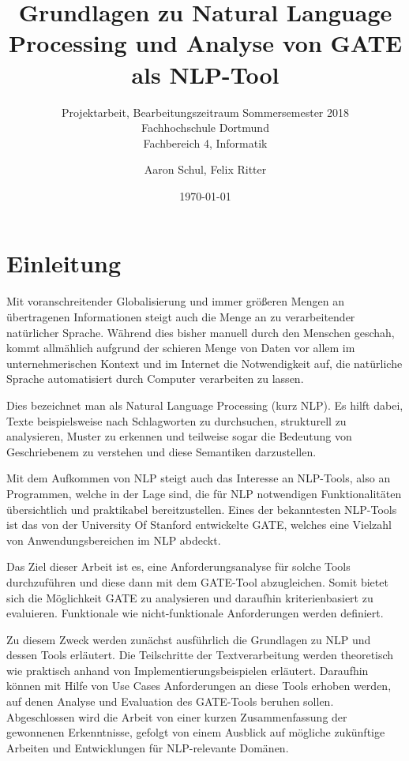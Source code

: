 \documentclass[12pt]{paper}
\begin{document}
\title{Grundlagen zu Natural Language Processing und Analyse von GATE als NLP-Tool}
\author{Aaron Schul, Felix Ritter}
\subtitle{Projektarbeit, Bearbeitungszeitraum Sommersemester 2018\\
Fachhochschule Dortmund \\
Fachbereich 4, Informatik}
\date{\today}
\maketitle

\newpage
\tableofcontents
\newpage
\listoftables

\newpage
\section{Einleitung}
Mit voranschreitender Globalisierung und immer größeren Mengen an übertragenen Informationen steigt auch die Menge an zu verarbeitender natürlicher Sprache. Während dies bisher manuell durch den Menschen geschah, kommt allmählich aufgrund der schieren Menge von Daten vor allem im unternehmerischen Kontext und im Internet die Notwendigkeit auf, die natürliche Sprache automatisiert durch Computer verarbeiten zu lassen.

Dies bezeichnet man als Natural Language Processing (kurz NLP). Es hilft dabei, Texte beispielsweise nach Schlagworten zu durchsuchen, strukturell zu analysieren, Muster zu erkennen und teilweise sogar die Bedeutung von Geschriebenem zu verstehen und diese Semantiken darzustellen.

Mit dem Aufkommen von NLP steigt auch das Interesse an NLP-Tools, also an Programmen, welche in der Lage sind, die für NLP notwendigen Funktionalitäten übersichtlich und praktikabel bereitzustellen. Eines der bekanntesten NLP-Tools ist das von der University Of Stanford entwickelte GATE, welches eine Vielzahl von Anwendungsbereichen im NLP abdeckt.

Das Ziel dieser Arbeit ist es, eine Anforderungsanalyse für solche Tools durchzuführen und diese dann mit dem GATE-Tool abzugleichen. Somit bietet sich die Möglichkeit GATE zu analysieren und daraufhin kriterienbasiert zu evaluieren. Funktionale wie nicht-funktionale Anforderungen werden definiert.

Zu diesem Zweck werden zunächst ausführlich die Grundlagen zu NLP und dessen Tools erläutert. Die Teilschritte der Textverarbeitung werden theoretisch wie praktisch anhand von Implementierungsbeispielen erläutert. Daraufhin können mit Hilfe von Use Cases Anforderungen an diese Tools erhoben werden, auf denen Analyse und Evaluation des GATE-Tools beruhen sollen. Abgeschlossen wird die Arbeit von einer kurzen Zusammenfassung der gewonnenen Erkenntnisse, gefolgt von einem Ausblick auf mögliche zukünftige Arbeiten und Entwicklungen für NLP-relevante Domänen. 
\newpage
\end{document}
